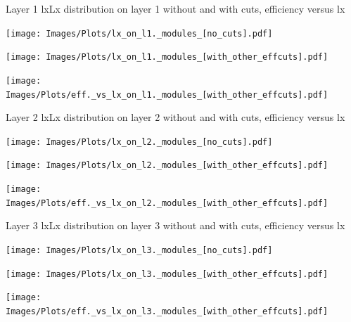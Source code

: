 \documentclass{beamer}
\begin{document}
\begin{frame}{Layer 1 lx}{Lx distribution on layer 1 without and with cuts, efficiency versus lx}
\begin{minipage}{0.32\textwidth}
  \centering
  \texttt{[image: Images/Plots/lx\_on\_l1.\_modules\_[no\_cuts].pdf]}
\end{minipage}%
\hspace{0.01\textwidth}%
\begin{minipage}{0.32\textwidth}
  \centering
  \texttt{[image: Images/Plots/lx\_on\_l1.\_modules\_[with\_other\_effcuts].pdf]}
\end{minipage}%
\hspace{0.01\textwidth}%
\begin{minipage}{0.32\textwidth}
  \centering
  \texttt{[image: Images/Plots/eff.\_vs\_lx\_on\_l1.\_modules\_[with\_other\_effcuts].pdf]}
\end{minipage}
\end{frame}

\begin{frame}{Layer 2 lx}{Lx distribution on layer 2 without and with cuts, efficiency versus lx}
\begin{minipage}{0.32\textwidth}
  \centering
  \texttt{[image: Images/Plots/lx\_on\_l2.\_modules\_[no\_cuts].pdf]}
\end{minipage}%
\hspace{0.01\textwidth}%
\begin{minipage}{0.32\textwidth}
  \centering
  \texttt{[image: Images/Plots/lx\_on\_l2.\_modules\_[with\_other\_effcuts].pdf]}
\end{minipage}%
\hspace{0.01\textwidth}%
\begin{minipage}{0.32\textwidth}
  \centering
  \texttt{[image: Images/Plots/eff.\_vs\_lx\_on\_l2.\_modules\_[with\_other\_effcuts].pdf]}
\end{minipage}
\end{frame}

\begin{frame}{Layer 3 lx}{Lx distribution on layer 3 without and with cuts, efficiency versus lx}
\begin{minipage}{0.32\textwidth}
  \centering
  \texttt{[image: Images/Plots/lx\_on\_l3.\_modules\_[no\_cuts].pdf]}
\end{minipage}%
\hspace{0.01\textwidth}%
\begin{minipage}{0.32\textwidth}
  \centering
  \texttt{[image: Images/Plots/lx\_on\_l3.\_modules\_[with\_other\_effcuts].pdf]}
\end{minipage}%
\hspace{0.01\textwidth}%
\begin{minipage}{0.32\textwidth}
  \centering
  \texttt{[image: Images/Plots/eff.\_vs\_lx\_on\_l3.\_modules\_[with\_other\_effcuts].pdf]}
\end{minipage}
\end{frame}
\end{document}
